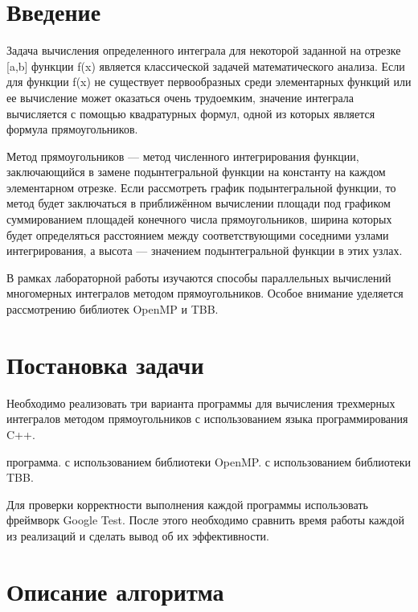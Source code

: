 \documentclass[14pt, a4paper]{extarticle}
\begin{document}
  \tableofcontents
  \thispagestyle{empty}
  \newpage

  \pagestyle{plain}
  \setcounter{page}{3}

  \section{Введение}
    Задача вычисления определенного интеграла для некоторой заданной на отрезке [a,b] функции f(x) является классической задачей математического анализа. Если для функции f(x) не существует первообразных среди элементарных функций или ее вычисление может оказаться очень трудоемким, значение интеграла вычисляется с помощью квадратурных формул, одной из которых является формула прямоугольников.

    Метод прямоугольников — метод численного интегрирования функции, заключающийся в замене подынтегральной функции на константу на каждом элементарном отрезке. Если рассмотреть график подынтегральной функции, то метод будет заключаться в приближённом вычислении площади под графиком суммированием площадей конечного числа прямоугольников, ширина которых будет определяться расстоянием между соответствующими соседними узлами интегрирования, а высота — значением подынтегральной функции в этих узлах.
    
    В рамках лабораторной работы изучаются способы параллельных вычислений многомерных интегралов методом прямоугольников. Особое внимание уделяется рассмотрению библиотек OpenMP и TBB.

  \newpage

  \section{Постановка задачи}
  Необходимо реализовать три варианта программы для вычисления трехмерных интегралов методом прямоугольников с использованием языка программирования C++.
   \begin{itemize}
 программа.
 с использованием библиотеки OpenMP.
 с использованием библиотеки TBB.
\end{itemize}
Для проверки корректности выполнения каждой программы использовать фреймворк Google Test.
После этого необходимо сравнить время работы каждой из реализаций и сделать вывод об их эффективности.
  \newpage

  \section{Описание алгоритма}
\end{document}
